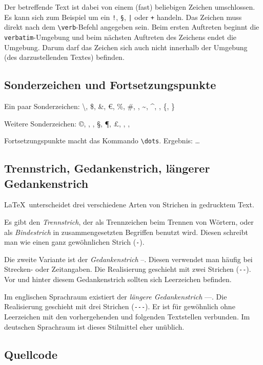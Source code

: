 \documentclass{llncs}
\begin{document}
Der betreffende Text ist dabei von einem (fast) beliebigen Zeichen umschlossen. Es kann sich zum Beispiel um ein \verb+!+, \verb!§!, \verb!|! oder \verb!+! handeln. Das Zeichen muss direkt nach dem \verb!\verb!-Befehl angegeben sein. Beim ersten Auftreten beginnt die \verb!verbatim!-Umgebung und beim nächsten Auftreten des Zeichens endet die Umgebung. Darum darf das Zeichen sich auch nicht innerhalb der Umgebung (des darzustellenden Textes) befinden.

\subsection{Sonderzeichen und Fortsetzungspunkte}

Ein paar Sonderzeichen: \textbackslash, \$, \&, \euro, \%, \#, \textunderscore, \textasciitilde, \textasciicircum, \textbar, \{, \}

Weitere Sonderzeichen: \copyright, \textregistered, \texttrademark, \S, \P, \pounds, \dag, \ddag, \textbullet

Fortsetzungspunkte macht das Kommando \verb!\dots!. Ergebnis: \dots

\subsection{Trennstrich, Gedankenstrich, längerer Gedankenstrich}

\LaTeX\ unterscheidet drei verschiedene Arten von Strichen in gedrucktem Text.

Es gibt den \emph{Trennstrich}, der als Trennzeichen beim Trennen von Wörtern, oder als \emph{Bindestrich} in zusammengesetzten Begriffen benutzt wird. Diesen schreibt man wie einen ganz gewöhnlichen Strich (\verb!-!).

Die zweite Variante ist der \emph{Gedankenstrich} --. Diesen verwendet man häufig bei Strecken- oder Zeitangaben. Die Realisierung geschieht mit zwei Strichen (\verb!--!). Vor und hinter diesem Gedankenstrich sollten sich Leerzeichen befinden.

Im englischen Sprachraum existiert der \emph{längere
Gedankenstrich} ---. Die Realisierung geschieht mit drei Strichen (\verb!---!). Er ist für gewöhnlich ohne Leerzeichen mit den vorhergehenden und folgenden Textstellen verbunden. Im deutschen Sprachraum ist dieses Stilmittel eher unüblich.

\subsection{Quellcode}
\end{document}
